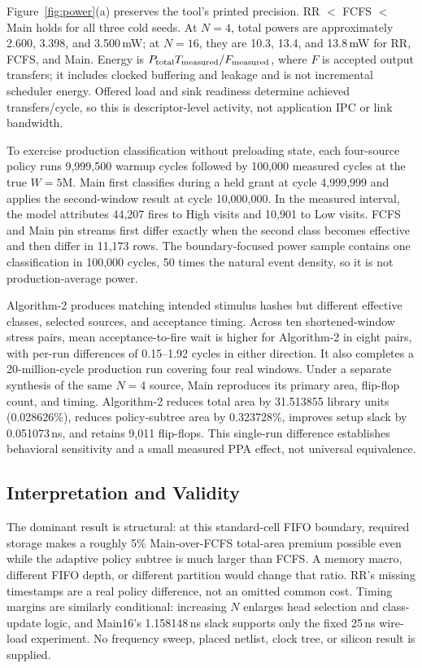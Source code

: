 Figure~\ref{fig:power}(a) preserves the tool's printed precision. RR $<$ FCFS $<$ Main holds for all three cold seeds. At $N=4$, total powers are approximately 2.600, 3.398, and 3.500\,mW; at $N=16$, they are 10.3, 13.4, and 13.8\,mW for RR, FCFS, and Main. Energy is $P_{\rm total}T_{\rm measured}/F_{\rm measured}$, where $F$ is accepted output transfers; it includes clocked buffering and leakage and is not incremental scheduler energy. Offered load and sink readiness determine achieved transfers/cycle, so this is descriptor-level activity, not application IPC or link bandwidth.

To exercise production classification without preloading state, each four-source policy runs 9,999,500 warmup cycles followed by 100,000 measured cycles at the true $W=5$M. Main first classifies during a held grant at cycle 4,999,999 and applies the second-window result at cycle 10,000,000. In the measured interval, the model attributes 44,207 fires to High visits and 10,901 to Low visits. FCFS and Main pin streams first differ exactly when the second class becomes effective and then differ in 11,173 rows. The boundary-focused power sample contains one classification in 100,000 cycles, 50 times the natural event density, so it is not production-average power.

Algorithm-2 produces matching intended stimulus hashes but different effective classes, selected sources, and acceptance timing. Across ten shortened-window stress pairs, mean acceptance-to-fire wait is higher for Algorithm-2 in eight pairs, with per-run differences of 0.15--1.92 cycles in either direction. It also completes a 20-million-cycle production run covering four real windows. Under a separate synthesis of the same $N=4$ source, Main reproduces its primary area, flip-flop count, and timing. Algorithm-2 reduces total area by 31.513855 library units (0.028626\%), reduces policy-subtree area by 0.323728\%, improves setup slack by 0.051073\,ns, and retains 9,011 flip-flops. This single-run difference establishes behavioral sensitivity and a small measured PPA effect, not universal equivalence.

\subsection{Interpretation and Validity}
The dominant result is structural: at this standard-cell FIFO boundary, required storage makes a roughly 5\% Main-over-FCFS total-area premium possible even while the adaptive policy subtree is much larger than FCFS. A memory macro, different FIFO depth, or different partition would change that ratio. RR's missing timestamps are a real policy difference, not an omitted common cost. Timing margins are similarly conditional: increasing $N$ enlarges head selection and class-update logic, and Main16's 1.158148\,ns slack supports only the fixed 25\,ns wire-load experiment. No frequency sweep, placed netlist, clock tree, or silicon result is supplied.

